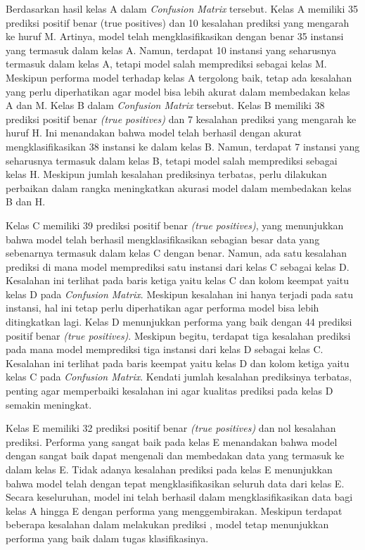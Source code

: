 Berdasarkan hasil kelas A dalam \textit{Confusion Matrix} tersebut. Kelas A memiliki 35 prediksi positif benar (true positives) dan 10 kesalahan prediksi yang mengarah ke huruf M. Artinya, model telah mengklasifikasikan dengan benar 35 instansi yang termasuk dalam kelas A. Namun, terdapat 10 instansi yang seharusnya termasuk dalam kelas A, tetapi model salah memprediksi sebagai kelas M. Meskipun performa model terhadap kelas A tergolong baik, tetap ada kesalahan yang perlu diperhatikan agar model bisa lebih akurat dalam membedakan kelas A dan M. Kelas B dalam \textit{Confusion Matrix} tersebut. Kelas B memiliki 38 prediksi positif benar \textit{(true positives)} dan 7 kesalahan prediksi yang mengarah ke huruf H. Ini menandakan bahwa model telah berhasil dengan akurat mengklasifikasikan 38 instansi ke dalam kelas B. Namun, terdapat 7 instansi yang seharusnya termasuk dalam kelas B, tetapi model salah memprediksi sebagai kelas H. Meskipun jumlah kesalahan prediksinya terbatas, perlu dilakukan perbaikan dalam rangka meningkatkan akurasi model dalam membedakan kelas B dan H.

Kelas C memiliki 39 prediksi positif benar \textit{(true positives)}, yang menunjukkan bahwa model telah berhasil mengklasifikasikan sebagian besar data yang sebenarnya termasuk dalam kelas C dengan benar. Namun, ada satu kesalahan prediksi di mana model memprediksi satu instansi dari kelas C sebagai kelas D. Kesalahan ini terlihat pada baris ketiga yaitu kelas C dan kolom keempat yaitu kelas D pada \textit{Confusion Matrix}. Meskipun kesalahan ini hanya terjadi pada satu instansi, hal ini tetap perlu diperhatikan agar performa model bisa lebih ditingkatkan lagi. Kelas D menunjukkan performa yang baik dengan 44 prediksi positif benar \textit{(true positives)}. Meskipun begitu, terdapat tiga kesalahan prediksi pada mana model memprediksi tiga instansi dari kelas D sebagai kelas C. Kesalahan ini terlihat pada baris keempat yaitu kelas D dan kolom ketiga yaitu kelas C pada \textit{Confusion Matrix}. Kendati jumlah kesalahan prediksinya terbatas, penting agar memperbaiki kesalahan ini agar kualitas prediksi pada kelas D semakin meningkat.

Kelas E memiliki 32 prediksi positif benar \textit{(true positives)} dan nol kesalahan prediksi. Performa yang sangat baik pada kelas E menandakan bahwa model dengan sangat baik dapat mengenali dan membedakan data yang termasuk ke dalam kelas E. Tidak adanya kesalahan prediksi pada kelas E menunjukkan bahwa model telah dengan tepat mengklasifikasikan seluruh data dari kelas E. Secara keseluruhan, model ini telah berhasil dalam mengklasifikasikan data bagi kelas A hingga E dengan performa yang menggembirakan. Meskipun terdapat beberapa kesalahan dalam melakukan prediksi , model tetap menunjukkan performa yang baik dalam tugas klasifikasinya. 

